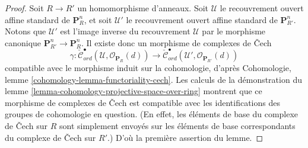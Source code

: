 \begin{proof}
Soit $R \to R'$ un homomorphisme d'anneaux.
Soit $\mathcal{U}$ le recouvrement ouvert affine standard de $\mathbf{P}^n_R$,
et soit $\mathcal{U}'$ le recouvrement ouvert affine standard de
$\mathbf{P}^n_{R'}$. Notons que $\mathcal{U}'$ est l'image inverse du recouvrement
$\mathcal{U}$ par le morphisme canonique
$\mathbf{P}^n_{R'} \to \mathbf{P}^n_R$. Il existe donc
un morphisme de complexes de {\v C}ech
$$
\gamma :
\check{\mathcal{C}}_{ord}^\bullet(\mathcal{U},
\mathcal{O}_{\mathbf{P}_R}(d))
\longrightarrow
\check{\mathcal{C}}_{ord}^\bullet(\mathcal{U}',
\mathcal{O}_{\mathbf{P}_{R'}}(d))
$$
compatible avec le morphisme induit sur la cohomologie, d'après
Cohomologie, lemme \ref{cohomology-lemma-functoriality-cech}.
Les calculs de la démonstration du
lemme \ref{lemma-cohomology-projective-space-over-ring}
montrent que ce morphisme de complexes de {\v C}ech est compatible avec les identifications des groupes
de cohomologie en question. (En effet, les éléments de base du complexe
de {\v C}ech sur $R$ sont simplement envoyés sur les éléments de base correspondants
du complexe de {\v C}ech sur $R'$.) D'où la première assertion du lemme.


\end{proof}
